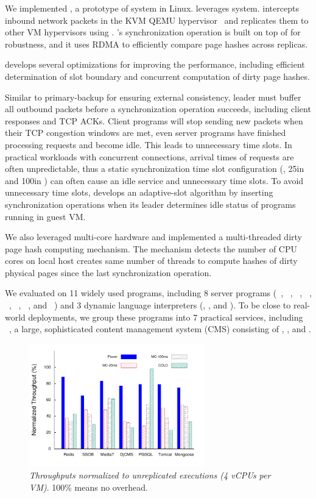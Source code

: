 We implemented \yyy, a prototype of \vsmr system in Linux. \yyy leverages 
\xxx \paxos system. \yyy intercepts inbound network packets in the KVM QEMU 
hypervisor~\cite{qemu} and replicates them to other VM hypervisors using \paxos. 
\yyy's synchronization operation is built on top of \paxos for robustness, and 
it uses RDMA to efficiently compare page hashes across replicas.

\yyy develops several optimizations for improving the performance, including  
efficient determination of slot boundary and concurrent 
computation of dirty page hashes.

Similar to primary-backup for ensuring external consistency, \xxx leader must 
buffer all outbound packets before a synchronization operation succeeds, 
including client responses and TCP ACKs. Client programs will stop sending new 
packets when their TCP congestion windows are met, even server programs have 
finished processing requests and become idle. This leads to unnecessary time 
slots. In practical workloads with concurrent connections, arrival times of 
requests are often unpredictable, thus a static synchronization time slot 
configuration (\eg, 25\ms in \remus and 100\ms in \qemumc) can often cause 
an idle service and unnecessary time slots. To avoid unnecessary time slots, 
\xxx develops an adaptive-slot algorithm by inserting synchronization operations 
when its leader determines idle status of programs running in guest VM.

We also leveraged multi-core hardware and implemented a multi-threaded dirty 
page hash computing mechanism. The mechanism detects the number of CPU cores on 
local host creates same number of threads to compute hashes of dirty physical 
pages since the last synchronization operation.

We evaluated \yyy on 11 widely used programs, including 8 server programs 
(\redis~\cite{redis}, \ssdb~\cite{ssdb}, \mediatomb~\cite{mediatomb}, 
\nginx~\cite{nginx}, \mysql~\cite{mysql}, \tomcat~\cite{tomcat}, 
\pgsql~\cite{pgsql}, and \mongoose~\cite{mongoose}) and 3 dynamic 
language interpreters (\php, \python, and \jsp). To be close to real-world 
deployments, we group these programs into 7 practical services, 
including \cms~\cite{django:cms}, a large, sophisticated content management 
system (CMS) consisting of \nginx, \python, and \mysql.

\begin{figure}[htbp]
\centering
\includegraphics[width=3in]{figures/FIG1__throughput-overhead}
\caption{{\em Throughputs normalized to unreplicated executions (4 vCPUs per 
VM)}. 100\% means no overhead.}
\label{fig:vmtput}
\end{figure}

